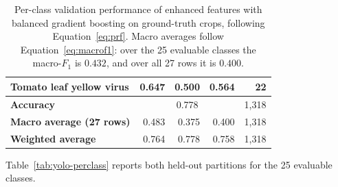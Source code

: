 \documentclass[a4paper,8pt]{article}
\begin{document}
\begin{table}[H]
\begin{tabularx}{0.92\textwidth}{|>{\raggedright\arraybackslash}X|r|r|r|r|}
Tomato leaf yellow virus & 0.647 & 0.500 & 0.564 & 22\\
\hline
\textbf{Accuracy} & \multicolumn{3}{c|}{0.778} & 1{,}318\\
\hline
\textbf{Macro average (27 rows)} & 0.483 & 0.375 & 0.400 & 1{,}318\\
\hline
\textbf{Weighted average} & 0.764 & 0.778 & 0.758 & 1{,}318\\
\hline
\end{tabularx}
\caption{Per-class validation performance of enhanced features with balanced gradient boosting on
ground-truth crops, following Equation~\eqref{eq:prf}. Macro averages follow
Equation~\eqref{eq:macrof1}: over the 25 evaluable classes the macro-$F_1$ is $0.432$, and over all
27 rows it is $0.400$.}
\label{tab:classical-report}
\end{table}

Table~\ref{tab:yolo-perclass} reports both held-out partitions for the 25 evaluable classes.
\end{document}
